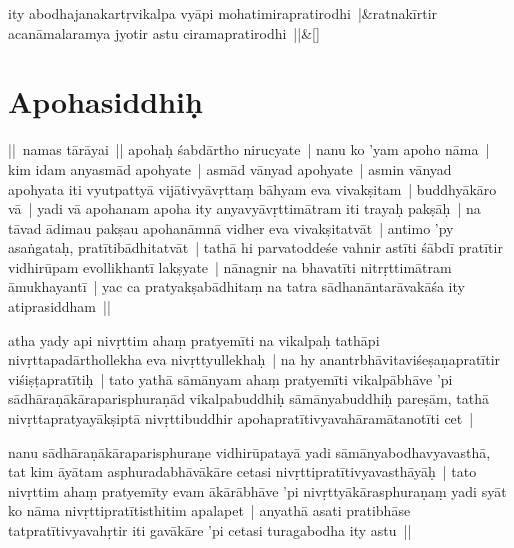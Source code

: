 \documentclass[article,12pt,a4paper]{memoir}%
\newcounter{parCount}
\begin{document}
	    
	    \stanza[\smallbreak]
	  \label{thakur75-57.14}ity abodhajanakartṛvikalpa vyāpi mohatimirapratirodhi |&ratnakīrtir acanāmalaramya jyotir astu ciramapratirodhi ||\&[\smallbreak]
	  
	  
	  
	    
	    \endnumbering%
	    \endgroup
	    
	  
	  
	
	    
	    \begingroup
	    \beginnumbering%
	    
	  
\chapter*[{Apohasiddhiḥ}]{Apohasiddhiḥ}\label{Apohasiddhiḥ}

	  \pstart \leavevmode%
	\label{thakur75-58.4}|| namas tārāyai || \label{thakur75-58.5} apohaḥ śabdārtho nirucyate | nanu ko 'yam apoho nāma | kim idam anyasmād apohyate | asmād vānyad apohyate | asmin vānyad apohyata iti vyutpattyā vijātivyāvṛttaṃ bāhyam eva vivakṣitam | buddhyākāro vā | yadi vā apohanam apoha ity anyavyāvṛttimātram iti trayaḥ pakṣāḥ | \label{thakur75-58.9} na tāvad ādimau pakṣau apohanāmnā vidher eva vivakṣitatvāt | antimo 'py asaṅgataḥ, pratītibādhitatvāt | tathā hi parvatoddeśe vahnir astīti śābdī pratītir vidhirūpam evollikhantī lakṣyate | nānagnir na bhavatīti nitrṛttimātram āmukhayantī | yac ca pratyakṣabādhitaṃ na tatra sādhanāntarāvakāśa ity atiprasiddham ||
	{}
	\pend%
      

	  \pstart \leavevmode%
	\label{thakur75-58.13}atha yady api nivṛttim ahaṃ pratyemīti na vikalpaḥ tathāpi nivṛttapadārthollekha eva nivṛttyullekhaḥ | na hy anantrbhāvitaviśeṣaṇapratītir viśiṣṭapratītiḥ | tato yathā sāmānyam ahaṃ pratyemīti vikalpābhāve 'pi sādhāraṇākāraparisphuraṇād vikalpabuddhiḥ sāmānyabuddhiḥ pareṣām, tathā nivṛttapratyayākṣiptā nivṛttibuddhir apohapratītivyavahāramātanotīti cet |
	{}
	\pend%
      

	  \pstart \leavevmode%
	\label{thakur75-58.18}nanu sādhāraṇākāraparisphuraṇe vidhirūpatayā yadi sāmānyabodhavyavasthā, tat kim āyātam asphuradabhāvākāre cetasi nivṛttipratītivyavasthāyāḥ | tato nivṛttim ahaṃ pratyemīty evam ākārābhāve 'pi nivṛttyākārasphuraṇaṃ yadi syāt ko nāma nivṛttipratītisthitim apalapet | anyathā asati pratibhāse tatpratītivyavahṛtir iti gavākāre 'pi cetasi turagabodha ity astu ||
	{}
	\pend%
      
\end{document}

